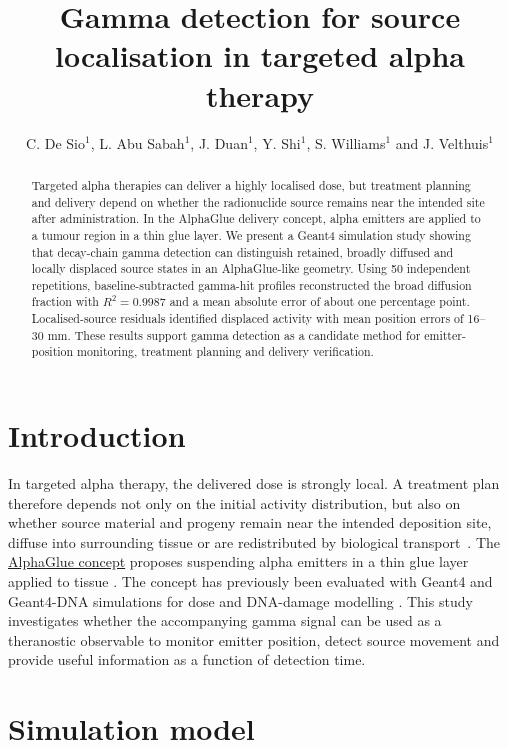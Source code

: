\documentclass{iopconfser}
\begin{document}
\title{Gamma detection for source localisation in targeted alpha therapy}

\author{C. De Sio$^{1}$, L. Abu Sabah$^{1}$, J. Duan$^{1}$, Y. Shi$^{1}$,
S. Williams$^{1}$ and J. Velthuis$^{1}$}


\begin{abstract}
Targeted alpha therapies can deliver a highly localised dose, but treatment
planning and delivery depend on whether the radionuclide source remains near
the intended site after administration. In the AlphaGlue delivery concept,
alpha emitters are applied to a tumour region in a thin glue layer. We present
a Geant4 simulation study showing that decay-chain gamma detection can
distinguish retained, broadly diffused and locally displaced source states in
an AlphaGlue-like geometry. Using 50 independent repetitions,
baseline-subtracted gamma-hit profiles reconstructed the broad diffusion
fraction with $R^2=0.9987$ and a mean absolute error of about one percentage
point. Localised-source residuals identified displaced activity with mean
position errors of 16--30 mm. These results support gamma detection as a
candidate method for emitter-position monitoring, treatment planning and
delivery verification.
\end{abstract}

\section{Introduction}

In targeted alpha therapy, the delivered dose is strongly local. A treatment
plan therefore depends not only on the initial activity distribution, but also
on whether source material and progeny remain near the intended deposition
site, diffuse into surrounding tissue or are redistributed by biological
transport~\cite{laura,heger}. The
\href{https://doi.org/10.3390/biomedinformatics5040058}{AlphaGlue concept}
proposes suspending alpha emitters in a thin glue layer applied to tissue
\cite{AlphaGlue2025}. The concept has previously been evaluated with Geant4
and Geant4-DNA simulations for dose and DNA-damage modelling
\cite{Geant4,Geant4DNA}. This study investigates whether the accompanying
gamma signal can be used as a theranostic observable to monitor emitter
position, detect source movement and provide useful information as a function
of detection time.

\section{Simulation model}
\end{document}
